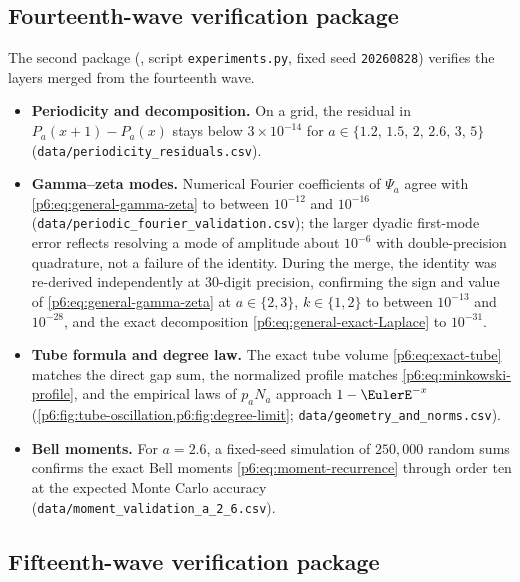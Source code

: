 \documentclass[11pt,oneside]{article}
\numberwithin{equation}{section}
\theoremstyle{definition}
\theoremstyle{remark}
\begin{document}
\subsection{Fourteenth-wave verification package}

The second package (,
script \texttt{experiments.py}, fixed seed \texttt{20260828}) verifies the
layers merged from the fourteenth wave.
\begin{itemize}
\item \textbf{Periodicity and decomposition.}  On a grid, the residual in
$P_a(x+1)-P_a(x)$ stays below $3\times10^{-14}$ for
$a\in\{1.2,\,1.5,\,2,\,2.6,\,3,\,5\}$
(\texttt{data/periodicity\_residuals.csv}).
\item \textbf{Gamma--zeta modes.}  Numerical Fourier coefficients of $\Psi_a$
agree with \eqref{p6:eq:general-gamma-zeta} to between $10^{-12}$ and
$10^{-16}$ (\texttt{data/periodic\_fourier\_validation.csv}); the larger
dyadic first-mode error reflects resolving a mode of amplitude about
$10^{-6}$ with double-precision quadrature, not a failure of the identity.
During the merge, the identity was re-derived independently at
30-digit precision, confirming the sign and value of
\eqref{p6:eq:general-gamma-zeta} at $a\in\{2,3\}$, $k\in\{1,2\}$ to
between $10^{-13}$ and $10^{-28}$, and the exact decomposition
\eqref{p6:eq:general-exact-Laplace} to $10^{-31}$.
\item \textbf{Tube formula and degree law.}  The exact tube volume
\eqref{p6:eq:exact-tube} matches the direct gap sum, the normalized profile
matches \eqref{p6:eq:minkowski-profile}, and the empirical laws of $p_aN_a$
approach $1-\EulerE^{-x}$ (\cref{p6:fig:tube-oscillation,p6:fig:degree-limit};
\texttt{data/geometry\_and\_norms.csv}).
\item \textbf{Bell moments.}  For $a=2.6$, a fixed-seed simulation of
$250{,}000$ random sums confirms the exact Bell moments
\eqref{p6:eq:moment-recurrence} through order ten at the expected Monte Carlo
accuracy (\texttt{data/moment\_validation\_a\_2\_6.csv}).
\end{itemize}

\subsection{Fifteenth-wave verification package}
\end{document}
